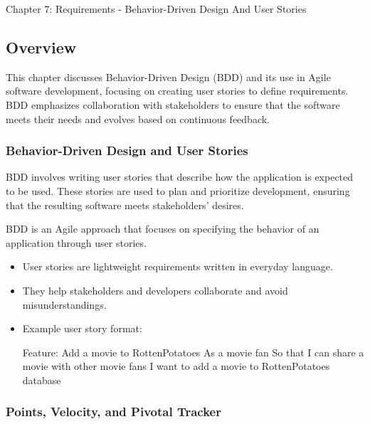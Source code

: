 \begin{notes}{Chapter 7: Requirements - Behavior-Driven Design And User Stories}
    \subsection*{Overview}

    This chapter discusses Behavior-Driven Design (BDD) and its use in Agile software development, focusing on creating user stories to define requirements. BDD emphasizes collaboration with stakeholders 
    to ensure that the software meets their needs and evolves based on continuous feedback.
    
    \subsubsection*{Behavior-Driven Design and User Stories}
    
    BDD involves writing user stories that describe how the application is expected to be used. These stories are used to plan and prioritize development, ensuring that the resulting software meets 
    stakeholders' desires.
    
    \begin{highlight}
    
        BDD is an Agile approach that focuses on specifying the behavior of an application through user stories.
        
        \begin{itemize}
            \item User stories are lightweight requirements written in everyday language.
            \item They help stakeholders and developers collaborate and avoid misunderstandings.
            \item Example user story format:
    \begin{code}[Bash]
    Feature: Add a movie to RottenPotatoes
    As a movie fan
    So that I can share a movie with other movie fans
    I want to add a movie to RottenPotatoes database
    \end{code}
        \end{itemize}
    
    \end{highlight}
    
    \subsubsection*{Points, Velocity, and Pivotal Tracker}
    

\end{notes}
